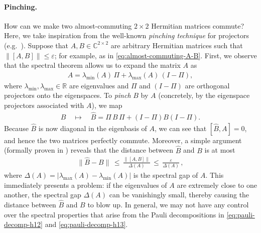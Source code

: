 \documentclass[11pt]{article}
\theoremstyle{plain}
\newcommand{\eps}{\varepsilon}
\begin{document}
\paragraph{Pinching.} How can we make two almost-commuting $2 \times 2$ Hermitian matrices commute? Here, we take inspiration from the well-known \emph{pinching technique} for projectors (e.g.~\cite{overlapping}). Suppose that $A,B \in \mathbb{C}^{2 \times 2}$ are arbitrary Hermitian matrices such that $\|[A,B]\| \leq \eps$; for example, as in \eqref{eq:almost-commuting-A-B}. First, we observe that the spectral theorem allows us to expand the matrix $A$ as 
\begin{align}
A = \lambda_{\min}(A) \, \Pi + \lambda_{\max}(A) \, (I -\Pi),
\end{align}
where $\lambda_{\min},\lambda_{\max} \in \mathbb{R}$ are eigenvalues and $\Pi$ and $(I -\Pi)$ are orthogonal projectors onto the eigenspaces. To \emph{pinch} $B$ by $A$ (concretely, by the eigenspace projectors associated with $A$), we map
\begin{align}\label{eq:ex-pinchining}
B \quad \mapsto \quad \hat{B} = \Pi \, B \, \Pi + (I-\Pi) B (I-\Pi).     
\end{align}
Because $\hat{B}$ is now diagonal in the eigenbasis of $A$, we can see that $[\hat{B},A]=0$, and hence the two matrices perfectly commute. Moreover, a simple argument (formally proven in ) reveals that the distance between $\hat B$ and $B$ is at most
\begin{align}\label{eq:pinching-for-B}
\|\hat{B} - B\| \, \leq \, \frac{\|[A,B]\|}{\Delta(A)} \, \leq \, \frac{\eps}{\Delta(A)} \, ,
\end{align}
where $\Delta(A) = |\lambda_{\max}(A) - \lambda_{\min}(A)|$ is the spectral gap of $A$. This immediately presents a problem: if the eigenvalues of $A$ are extremely close to one another, the spectral gap $\Delta(A)$ can be vanishingly small, thereby causing the distance between $\hat{B}$ and $B$ to blow up. In general, we may not have any control over the spectral properties that arise from the Pauli decompositions in \eqref{eq:pauli-decomp-h12} and \eqref{eq:pauli-decomp-h13}. 
\end{document}
